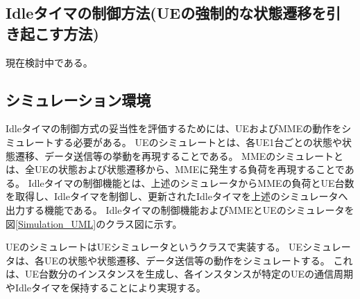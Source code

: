 \documentclass[a4j]{ujarticle}
\begin{document}
\subsection{Idleタイマの制御方法(UEの強制的な状態遷移を引き起こす方法)}
\label{sec:soft-state}
現在検討中である。
%
%

\subsection{シミュレーション環境}
\label{sec:simulation_system}

Idleタイマの制御方式の妥当性を評価するためには、UEおよびMMEの動作をシミュレートする必要がある。
UEのシミュレートとは、各UE1台ごとの状態や状態遷移、データ送信等の挙動を再現することである。
MMEのシミュレートとは、全UEの状態および状態遷移から、MMEに発生する負荷を再現することである。
Idleタイマの制御機能とは、上述のシミュレータからMMEの負荷とUE台数を取得し、Idleタイマを制御し、更新されたIdleタイマを上述のシミュレータへ出力する機能である。
Idleタイマの制御機能およびMMEとUEのシミュレータを図\ref{Simulation_UML}のクラス図に示す。

UEのシミュレートはUEシミュレータというクラスで実装する。
UEシミュレータは、各UEの状態や状態遷移、データ送信等の動作をシミュレートする。
これは、UE台数分のインスタンスを生成し、各インスタンスが特定のUEの通信周期やIdleタイマを保持することにより実現する。
\end{document}
